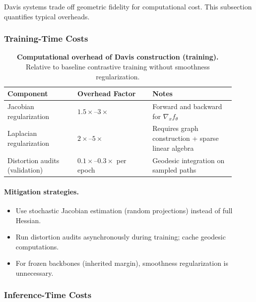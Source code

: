 \documentclass[11pt]{article}
\theoremstyle{remark}
\theoremstyle{plain}
\begin{document}
Davis systems trade off geometric fidelity for computational cost. This subsection quantifies typical overheads.

\subsubsection{Training-Time Costs}

\begin{table}[H]
\centering
\caption{\textbf{Computational overhead of Davis construction (training).} Relative to baseline contrastive training without smoothness regularization.}
\label{tab:training-costs}
\begin{tabularx}{\linewidth}{@{}p{0.28\linewidth}p{0.30\linewidth}p{0.33\linewidth}@{}}
\toprule
\textbf{Component} & \textbf{Overhead Factor} & \textbf{Notes} \\
\midrule
Jacobian regularization & $1.5\times$--$3\times$ & Forward and backward for $\nabla_x f_\theta$ \\
Laplacian regularization & $2\times$--$5\times$ & Requires graph construction + sparse linear algebra \\
Distortion audits (validation) & $0.1\times$--$0.3\times$ per epoch & Geodesic integration on sampled paths \\
\bottomrule
\end{tabularx}
\end{table}

\paragraph{Mitigation strategies.}
\begin{itemize}[leftmargin=*]
  \item Use stochastic Jacobian estimation (random projections) instead of full Hessian.
  \item Run distortion audits asynchronously during training; cache geodesic computations.
  \item For frozen backbones (inherited margin), smoothness regularization is unnecessary.
\end{itemize}

\subsubsection{Inference-Time Costs}
\end{document}
